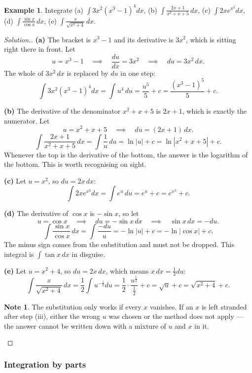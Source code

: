 \documentclass[11pt,a4paper]{article}
\theoremstyle{definition}
\newtheorem{example}[thm]{Example}
\newtheorem{note}[thm]{Note}
\newenvironment{solution}
  {\renewcommand{\qedsymbol}{}\begin{proof}[\textit{Solution}.]}
  {\end{proof}}
\begin{document}
\begin{example}
Integrate \quad (a) $\displaystyle\int 3x^2\left(x^3-1\right)^4dx$, \quad
(b) $\displaystyle\int\frac{2x+1}{x^2+x+5}\,dx$, \quad
(c) $\displaystyle\int 2xe^{x^2}dx$, \quad
(d) $\displaystyle\int\frac{\sin x}{\cos x}\,dx$, \quad
(e) $\displaystyle\int\frac{x}{\sqrt{x^2+4}}\,dx$.
\end{example}

\begin{solution}
\textbf{(a)} The bracket is $x^3-1$ and its derivative is $3x^2$, which is sitting right
there in front. Let
$$u=x^3-1\quad\implies\quad \frac{du}{dx}=3x^2\quad\implies\quad du=3x^2\,dx.$$
The whole of $3x^2\,dx$ is replaced by $du$ in one step:
$$\int 3x^2\left(x^3-1\right)^4dx=\int u^4\,du=\frac{u^5}{5}+c
=\frac{\left(x^3-1\right)^5}{5}+c.$$

\textbf{(b)} The derivative of the denominator $x^2+x+5$ is $2x+1$, which is exactly the
numerator. Let
$$u=x^2+x+5\quad\implies\quad du=(2x+1)\,dx.$$
$$\int\frac{2x+1}{x^2+x+5}\,dx=\int\frac{1}{u}\,du=\ln|u|+c=\ln\left|x^2+x+5\right|+c.$$
Whenever the top is the derivative of the bottom, the answer is the logarithm of the
bottom. This is worth recognising on sight.

\textbf{(c)} Let $u=x^2$, so $du=2x\,dx$:
$$\int 2xe^{x^2}dx=\int e^u\,du=e^u+c=e^{x^2}+c.$$

\textbf{(d)} The derivative of $\cos x$ is $-\sin x$, so let
$$u=\cos x\quad\implies\quad du=-\sin x\,dx\quad\implies\quad \sin x\,dx=-du.$$
$$\int\frac{\sin x}{\cos x}\,dx=\int\frac{-du}{u}=-\ln|u|+c=-\ln|\cos x|+c.$$
The minus sign comes from the substitution and must not be dropped. This integral is
$\int\tan x\,dx$ in disguise.

\textbf{(e)} Let $u=x^2+4$, so $du=2x\,dx$, which means $x\,dx=\frac{1}{2}du$:
$$\int\frac{x}{\sqrt{x^2+4}}\,dx=\frac{1}{2}\int u^{-\frac{1}{2}}du
=\frac{1}{2}\cdot\frac{u^{\frac{1}{2}}}{\frac{1}{2}}+c=\sqrt{u}+c=\sqrt{x^2+4}+c.$$

\begin{note}
The substitution only works if every $x$ vanishes. If an $x$ is left stranded after
step (iii), either the wrong $u$ was chosen or the method does not apply --- the answer
cannot be written down with a mixture of $u$ and $x$ in it.
\end{note}
\end{solution}

\subsubsection{Integration by parts}
\end{document}
